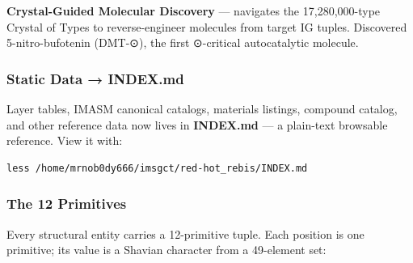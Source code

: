 \documentclass[12pt,a4paper]{article}
\begin{document}
\textbf{Crystal-Guided Molecular Discovery} --- navigates the
17,280,000-type Crystal of Types to reverse-engineer molecules from
target IG tuples. Discovered 5-nitro-bufotenin (DMT-⊙), the first
⊙-critical autocatalytic molecule.

\hypertarget{static-data-index.md}{%
\subsubsection{Static Data → INDEX.md}\label{static-data-index.md}}

Layer tables, IMASM canonical catalogs, materials listings, compound
catalog, and other reference data now lives in \textbf{INDEX.md} --- a
plain-text browsable reference. View it with:

\begin{verbatim}
less /home/mrnob0dy666/imsgct/red-hot_rebis/INDEX.md
\end{verbatim}

\hypertarget{the-12-primitives}{%
\subsubsection{The 12 Primitives}\label{the-12-primitives}}

Every structural entity carries a 12-primitive tuple. Each position is
one primitive; its value is a Shavian character from a 49-element set:
\end{document}
